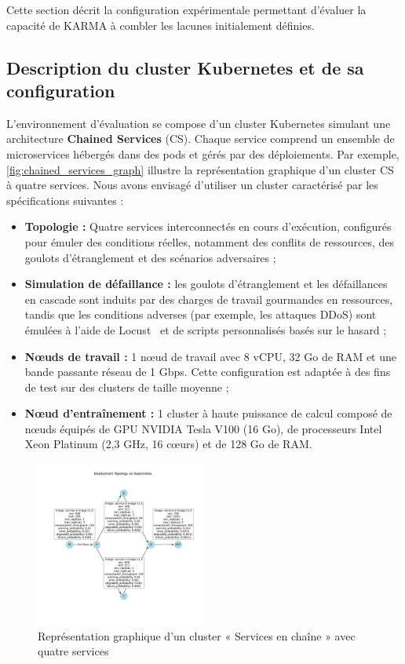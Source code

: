Cette section décrit la configuration expérimentale permettant d'évaluer la capacité de KARMA à combler les lacunes initialement définies.

\subsection{Description du cluster Kubernetes et de sa configuration}

L'environnement d'évaluation se compose d'un cluster Kubernetes simulant une architecture \textbf{Chained Services} (CS). Chaque service comprend un ensemble de microservices hébergés dans des pods et gérés par des déploiements. Par exemple, \autoref{fig:chained_services_graph} illustre la représentation graphique d'un cluster CS à quatre services. Nous avons envisagé d'utiliser un cluster caractérisé par les spécifications suivantes :

\begin{itemize}
    \item \textbf{Topologie :} Quatre services interconnectés en cours d'exécution, configurés pour émuler des conditions réelles, notamment des conflits de ressources, des goulots d'étranglement et des scénarios adversaires ;
    \item \textbf{Simulation de défaillance :} les goulots d'étranglement et les défaillances en cascade sont induits par des charges de travail gourmandes en ressources, tandis que les conditions adverses (par exemple, les attaques DDoS) sont émulées à l'aide de Locust~\cite{locust2021} et de scripts personnalisés basés sur le hasard ;
    \item \textbf{Nœuds de travail :} 1 nœud de travail avec 8 vCPU, 32 Go de RAM et une bande passante réseau de 1 Gbps. Cette configuration est adaptée à des fins de test sur des clusters de taille moyenne ;
    \item \textbf{Nœud d'entraînement :} 1 cluster à haute puissance de calcul composé de nœuds équipés de GPU NVIDIA Tesla V100 (16 Go), de processeurs Intel Xeon Platinum (2,3 GHz, 16 cœurs) et de 128 Go de RAM.
\end{itemize}

\begin{figure}[h!]
    \centering
    \hspace{-0,4cm}
    \includegraphics[trim=1.8cm 3.3cm 1.25cm 3.5cm, clip, width=0.5\textwidth]{figures/k8s_cluster_graph.pdf}
    \caption{Représentation graphique d'un cluster « Services en chaîne » avec quatre services}
    \label{fig:chained_services_graph}
\end{figure}

